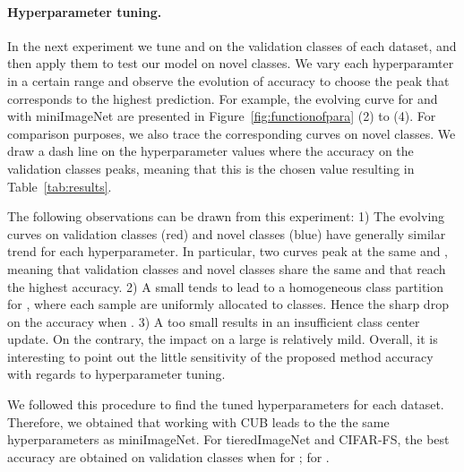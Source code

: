 \documentclass[twoside]{article}
\begin{document}
\paragraph{Hyperparameter tuning.} In the next experiment we tune  and  on the validation classes of each dataset, and then apply them to test our model on novel classes. We vary each hyperparamter in a certain range and observe the evolution of accuracy to choose the peak that corresponds to the highest prediction. For example, the evolving curve for  and  with miniImageNet are presented in Figure~\ref{fig:functionofpara} (2) to (4). For comparison purposes, we also trace the corresponding curves on novel classes. We draw a dash line on the hyperparameter values where the accuracy on the validation classes peaks, meaning that this is the chosen value resulting in Table~\ref{tab:results}.

The following observations can be drawn from this experiment: 1) The evolving curves on validation classes (red) and novel classes (blue) have generally similar trend for each hyperparameter. In particular, two curves peak at the same   and  , meaning that validation classes and novel classes share the same  and  that reach the highest accuracy. 2) A small  tends to lead to a homogeneous class partition for , where each sample are uniformly allocated to  classes. Hence the sharp drop on the accuracy when . 3) A too small  results in an insufficient class center update. On the contrary, the impact on a large  is relatively mild. Overall, it is interesting to point out the little sensitivity of the proposed method accuracy with regards to hyperparameter tuning.

We followed this procedure to find the tuned hyperparameters for each dataset. Therefore, we obtained that working with CUB leads to the the same hyperparameters as miniImageNet. For tieredImageNet and CIFAR-FS, the best accuracy are obtained on validation classes when  for ;  for .
\end{document}
